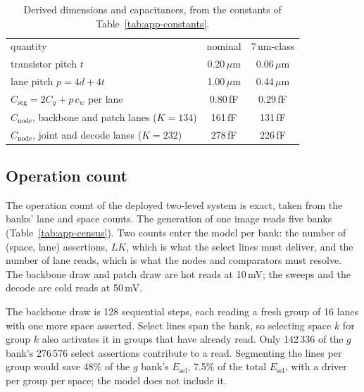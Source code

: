 \documentclass[reprint,amsmath,amssymb,aps,nofootinbib]{revtex4-2}
\begin{document}
\begin{table}
\caption{Derived dimensions and capacitances, from the constants of
Table~\ref{tab:app-constants}.\label{tab:app-derived}}
\footnotesize
\begin{ruledtabular}
\begin{tabular}{lcc}
quantity & nominal & 7\,nm-class \\
\colrule
transistor pitch $t$ & 0.20\,$\mu$m & 0.06\,$\mu$m \\
lane pitch $p = 4d + 4t$ & 1.00\,$\mu$m & 0.44\,$\mu$m \\
$C_{\mathrm{seg}} = 2C_g + p\,c_w$ per lane & 0.80\,fF & 0.29\,fF \\
$C_{\mathrm{node}}$, backbone and patch lanes ($K = 134$) & 161\,fF & 131\,fF \\
$C_{\mathrm{node}}$, joint and decode lanes ($K = 232$) & 278\,fF & 226\,fF \\
\end{tabular}
\end{ruledtabular}
\end{table}

\subsection{Operation count}\label{app:census}

The operation count of the deployed two-level system is exact, taken
from the banks' lane and space counts. The generation of one image reads
five banks (Table~\ref{tab:app-census}). Two counts enter the model per
bank: the number of (space, lane) assertions, $L K$, which is what the
select lines must deliver, and the number of lane reads, which is what
the nodes and comparators must resolve. The backbone draw and patch draw
are hot reads at 10\,mV; the sweeps and the decode are cold reads at
50\,mV.

The backbone draw is 128 sequential steps, each reading a fresh group of
16 lanes with one more space asserted. Select lines span the bank, so selecting space $k$ for group $k$ also
activates it in groups that have already read. Only 142\,336 of the $g$
bank's 276\,576 select assertions contribute to a read. Segmenting the lines per group would save 48\% of
the $g$ bank's $E_{\mathrm{sel}}$, 7.5\% of the total
$E_{\mathrm{sel}}$, with a driver per group per space; the
model does not include it.
\end{document}
